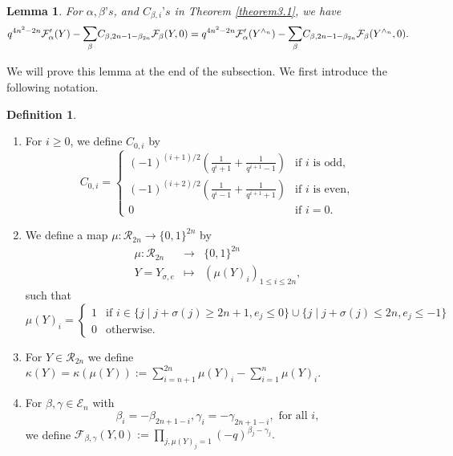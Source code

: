 \documentclass[11pt,oneside]{amsart}
\theoremstyle{plain}
\newtheorem{lemma}[theorem]{Lemma}
\theoremstyle{definition}
\newtheorem{definition}[theorem]{Definition}
\theoremstyle{remark}
\newcommand{\tx}[1]{\text{#1}}
\newcommand{\CE}{{\mathcal E}}
\newcommand{\CF}{{\mathcal F}}
\newcommand{\CR}{{\mathcal R}}
\numberwithin{equation}{section}
\begin{document}
	
	
	
	
	
	\begin{lemma}\label{lemma3.2} For $\alpha,\beta\tx{'}s$, and $C_{\beta,i}\tx{'}s$ in Theorem \ref{theorem3.1}, we have
		\begin{equation*}
			q^{4n^2-2n}\CF_{\alpha}'(Y)-\mathlarger{\sum}_{\beta}C_{\beta,2n-1-\beta_{2n}}\CF_{\beta}(Y,0)=q^{4n^2-2n}\CF_{\alpha}'(Y^{\wedge_n})-\mathlarger{\sum}_{\beta}C_{\beta,2n-1-\beta_{2n}}\CF_{\beta}(Y^{\wedge_n},0).
		\end{equation*}
	\end{lemma}
	We will prove this lemma at the end of the subsection. We first introduce the following notation.
	
	\begin{definition}\label{definition3.3}
		\begin{enumerate}
			\item For $i \geq 0$, we define $C_{0,i}$ by
			\begin{equation*}
				C_{0,i}=\left\lbrace \begin{array}{ll}
					(-1)^{(i+1)/2}(\frac{1}{q^i+1}+\frac{1}{q^{i+1}-1}) & \tx{if }i \tx{ is odd},\\
					(-1)^{(i+2)/2}(\frac{1}{q^i-1}+\frac{1}{q^{i+1}+1}) & \tx{if }i \tx{ is even},\\
					0 & \tx{if }i=0.
				\end{array}\right.
			\end{equation*}
			
			\item We define a map $\mu:\CR_{2n} \rightarrow \lbrace 0,1 \rbrace^{2n}$ by
			\begin{equation*}
				\begin{array}{lcl}
					\mu:\CR_{2n} &\rightarrow & \lbrace 0,1\rbrace^{2n}\\
					Y=Y_{\sigma,e} & \mapsto & (\mu(Y)_i)_{1 \leq i \leq 2n},
				\end{array}
			\end{equation*}
			such that
			\begin{equation*}
				\mu(Y)_i= \left\lbrace \begin{array}{ll} 1 &\tx{if }i \in \lbrace j \mid j+\sigma(j) \geq 2n+1, e_j \leq 0\rbrace \cup \lbrace j \mid j+\sigma(j)\leq 2n, e_j \leq -1\rbrace \\
					0 & \tx{otherwise.} \end{array}\right.
			\end{equation*}
			\item For $Y \in \CR_{2n}$ we define $\kappa(Y)=\kappa(\mu(Y)):=\sum_{i=n+1}^{2n}\mu(Y)_i-\sum_{i=1}^{n}\mu(Y)_i.$
			
			\item For $\beta, \gamma \in \CE_n$ with
			\begin{equation*}
				\beta_i=-\beta_{2n+1-i}, \gamma_i=-\gamma_{2n+1-i}, \tx{ for all } i,
			\end{equation*}
			we define $\CF_{\beta,\gamma}(Y,0):=\prod_{j, \mu(Y)_j=1} (-q)^{\beta_j-\gamma_j}.$
			
		\end{enumerate}
	\end{definition}
	
\end{document}
